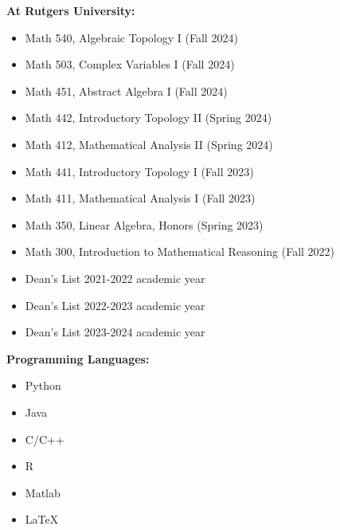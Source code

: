 \documentclass{article}
\begin{document}
		\noindent \textbf{At Rutgers University:}
		\begin{itemize}[noitemsep, nolistsep]
				\item Math 540, Algebraic Topology I (Fall 2024)
				\item Math 503, Complex Variables I (Fall 2024) 
				\item Math 451, Abstract Algebra I (Fall 2024) 
				\item Math 442, Introductory Topology II (Spring 2024) 
				\item Math 412, Mathematical Analysis II (Spring 2024) 
				\item Math 441, Introductory Topology I (Fall 2023) 
				\item Math 411, Mathematical Analysis I (Fall 2023) 
				\item Math 350, Linear Algebra, Honors (Spring 2023) 
				\item Math 300, Introduction to Mathematical Reasoning (Fall 2022)
		\end{itemize}
		\vspace{1.0em} 

		\begin{itemize}[noitemsep]
				\item Dean's List 2021-2022 academic year 
				\item Dean's List 2022-2023 academic year 
				\item Dean's List 2023-2024 academic year 
		\end{itemize}
		\vspace{1.0em}
		
		\noindent \textbf{Programming Languages:}
		\vspace{-0.8em}
		\begin{multicols}{2}
				\begin{itemize}[noitemsep, nolistsep]
						\item Python 
						\item Java 
						\item C/C++
						\item R 
						\item Matlab 
						\item \LaTeX 
				\end{itemize}
		\end{multicols}
\end{document}
